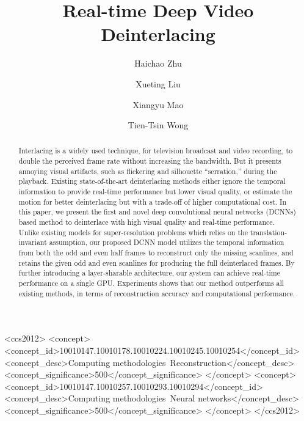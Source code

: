 \documentclass[acmtog]{acmart}
\begin{document}
\title{Real-time Deep Video Deinterlacing}

\author{Haichao Zhu}

\author{Xueting Liu}

\author{Xiangyu Mao}

\author{Tien-Tsin Wong}



\begin{abstract}
Interlacing is a widely used technique, for television broadcast and video
recording, to double the perceived frame rate without increasing the bandwidth.
But it presents annoying visual artifacts, such as flickering and silhouette
``serration,''  during the playback. Existing state-of-the-art deinterlacing
methods either ignore the temporal information to provide real-time performance
but lower visual quality, or estimate the motion for better deinterlacing but
with a trade-off of higher computational cost. In this paper, we present 
the first and novel deep convolutional neural networks (DCNNs) based method to
deinterlace with high visual quality and real-time performance. Unlike existing
models for super-resolution problems which relies on the translation-invariant
assumption, our proposed DCNN model utilizes the temporal information from both
the odd and even half frames to reconstruct only the missing scanlines, and retains
the given odd and even scanlines for producing the full deinterlaced frames.
By further introducing a layer-sharable architecture, our system can achieve
real-time performance on a single GPU. Experiments shows that our
method outperforms all existing methods, in terms of 
reconstruction accuracy and computational performance.
\end{abstract}



\begin{CCSXML}
	<ccs2012>
	<concept>
	<concept_id>10010147.10010178.10010224.10010245.10010254</concept_id>
	<concept_desc>Computing methodologies~Reconstruction</concept_desc>
	<concept_significance>500</concept_significance>
	</concept>
	<concept>
	<concept_id>10010147.10010257.10010293.10010294</concept_id>
	<concept_desc>Computing methodologies~Neural networks</concept_desc>
	<concept_significance>500</concept_significance>
	</concept>
	</ccs2012>
\end{CCSXML}
\end{document}

